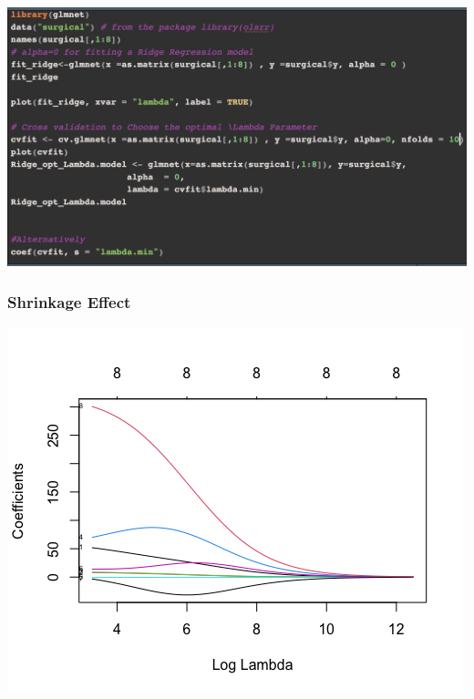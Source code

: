 \documentclass[compress]{beamer}
\begin{document}
\begin{frame}

\includegraphics[scale=.4]{figs8/Screen Shot RidgeCode1.png} \\


\end{frame}

\begin{frame}\frametitle{Shrinkage Effect}

\vspace{.1in}
\vspace{2in}

\end{frame}




\begin{frame}

\includegraphics[scale=.65]{figs8/Ridge_coef.png} \\


\end{frame}
\end{document}
